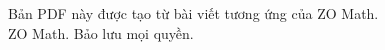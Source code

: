 \begin{center}
  \href{\zoPdfCanonicalUrl}{\qrcode[height=17mm]{\zoPdfCanonicalUrl}}\par
  \vspace{0.55em}
  {\small\bfseries\href{\zoPdfCanonicalUrl}{\zoPdfDisplayUrl}\par}
  \vspace{0.8em}
  \begin{minipage}{0.84\textwidth}
    \centering
    \small\color{zomathgray}
    Bản PDF này được tạo từ bài viết tương ứng của ZO Math.\\[0.3em]
    \textcopyright{} \the\year{} ZO Math. Bảo lưu mọi quyền.
  \end{minipage}
\end{center}
\clearpage
